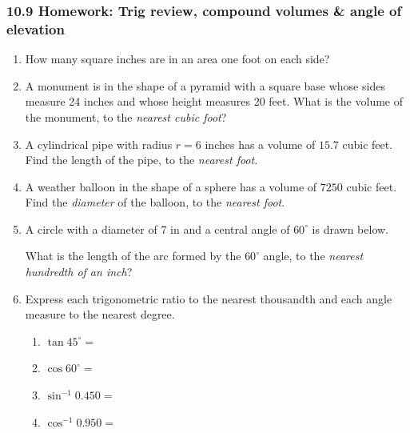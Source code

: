 \documentclass[12pt, twoside]{article}
\begin{document}
\subsubsection*{10.9 Homework: Trig review, compound volumes \& angle of elevation}
 \begin{enumerate}

  \item How many square inches are in an area one foot on each side? \vspace{2.5cm}

  \item A monument is in the shape of a pyramid with a square base whose sides measure 24 inches and whose height measures 20 feet. What is the volume of the monument, to the \emph{nearest cubic foot}? \vspace{3.5cm}

  \item A cylindrical pipe with radius $r=6$ inches has a volume of $15.7$ cubic feet. Find the length of the pipe, to the \emph{nearest foot}. \vspace{3.5cm}

  \item A weather balloon in the shape of a sphere has a volume of $7250$ cubic feet. Find the \emph{diameter} of the balloon, to the \emph{nearest foot}. \vspace{3.5cm}

\newpage

  \item A circle with a diameter of 7 in and a central angle of $60^\circ$ is drawn below.
       \begin{center}
     \end{center}
  What is the length of the arc formed by the $60^\circ$ angle, to the \emph{nearest hundredth of an inch}? \vspace{3cm}


  \item Express each trigonometric ratio to the nearest thousandth and each angle measure to the nearest degree.
    \begin{multicols}{2}
      \begin{enumerate}
        \item $\tan 45^\circ =$ \vspace{0.5cm}
        \item $\cos 60^\circ =$
        \item $\sin^{-1} 0.450 =$ \vspace{0.5cm}
        \item $\cos^{-1} 0.950 =$
      \end{enumerate}
    \end{multicols} \vspace{0.25cm}


\end{enumerate}
\end{document}
